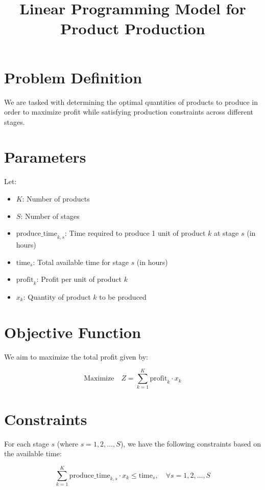\documentclass{article}
\begin{document}
\title{Linear Programming Model for Product Production}
\author{}
\date{}
\maketitle

\section*{Problem Definition}

We are tasked with determining the optimal quantities of products to produce in order to maximize profit while satisfying production constraints across different stages.

\section*{Parameters}

Let:
\begin{itemize}
    \item \( K \): Number of products
    \item \( S \): Number of stages
    \item \( \text{produce\_time}_{k,s} \): Time required to produce 1 unit of product \( k \) at stage \( s \) (in hours)
    \item \( \text{time}_{s} \): Total available time for stage \( s \) (in hours)
    \item \( \text{profit}_{k} \): Profit per unit of product \( k \)
    \item \( x_{k} \): Quantity of product \( k \) to be produced
\end{itemize}

\section*{Objective Function}

We aim to maximize the total profit given by:

\[
\text{Maximize} \quad Z = \sum_{k=1}^{K} \text{profit}_{k} \cdot x_{k}
\]

\section*{Constraints}

For each stage \( s \) (where \( s = 1, 2, \ldots, S \)), we have the following constraints based on the available time:

\[
\sum_{k=1}^{K} \text{produce\_time}_{k,s} \cdot x_{k} \leq \text{time}_{s}, \quad \forall s = 1, 2, \ldots, S
\]
\end{document}
